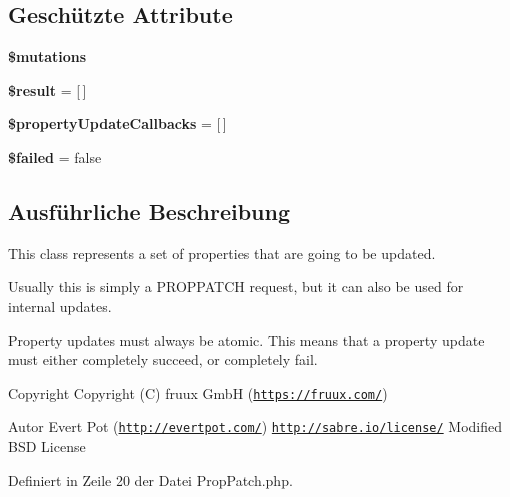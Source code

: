 \subsection*{Geschützte Attribute}
\begin{DoxyCompactItemize}
\item 
\mbox{\label{class_sabre_1_1_d_a_v_1_1_prop_patch_a10d690dd83537c2f3f15e836419b1314}} 
{\bfseries \$mutations}
\item 
\mbox{\label{class_sabre_1_1_d_a_v_1_1_prop_patch_a33635c11fd05f8c4f779e5689636088e}} 
{\bfseries \$result} = \mbox{[}$\,$\mbox{]}
\item 
\mbox{\label{class_sabre_1_1_d_a_v_1_1_prop_patch_a64dd54714eee2a93ec2f6fb9acd9090b}} 
{\bfseries \$property\+Update\+Callbacks} = \mbox{[}$\,$\mbox{]}
\item 
\mbox{\label{class_sabre_1_1_d_a_v_1_1_prop_patch_afc5528b2a5a3ff09329f852183707c30}} 
{\bfseries \$failed} = false
\end{DoxyCompactItemize}


\subsection{Ausführliche Beschreibung}
This class represents a set of properties that are going to be updated.

Usually this is simply a P\+R\+O\+P\+P\+A\+T\+CH request, but it can also be used for internal updates.

Property updates must always be atomic. This means that a property update must either completely succeed, or completely fail.

\begin{DoxyCopyright}{Copyright}
Copyright (C) fruux GmbH (\href{https://fruux.com/}{\tt https\+://fruux.\+com/}) 
\end{DoxyCopyright}
\begin{DoxyAuthor}{Autor}
Evert Pot (\href{http://evertpot.com/}{\tt http\+://evertpot.\+com/})  \href{http://sabre.io/license/}{\tt http\+://sabre.\+io/license/} Modified B\+SD License 
\end{DoxyAuthor}


Definiert in Zeile 20 der Datei Prop\+Patch.\+php.



